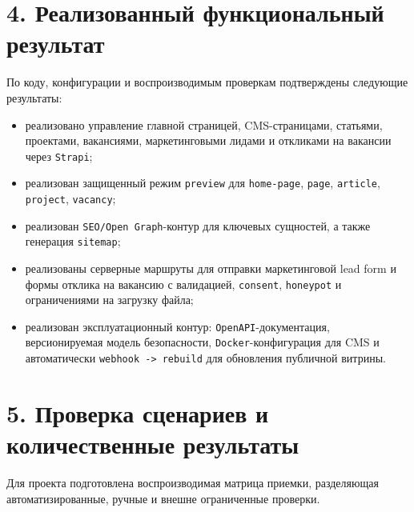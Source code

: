 \documentclass[12pt,a4paper]{article}
\begin{document}
\section*{4. Реализованный функциональный результат}

По коду, конфигурации и воспроизводимым проверкам подтверждены следующие результаты:
\begin{itemize}
  \item реализовано управление главной страницей, CMS-страницами, статьями, проектами,
  вакансиями, маркетинговыми лидами и откликами на вакансии через \texttt{Strapi};
  \item реализован защищенный режим \texttt{preview} для \texttt{home-page}, \texttt{page},
  \texttt{article}, \texttt{project}, \texttt{vacancy};
  \item реализован \texttt{SEO/Open Graph}-контур для ключевых сущностей, а также генерация
  \texttt{sitemap};
  \item реализованы серверные маршруты для отправки маркетинговой lead form и формы отклика
  на вакансию с валидацией, \texttt{consent}, \texttt{honeypot} и ограничениями на загрузку
  файла;
  \item реализован эксплуатационный контур: \texttt{OpenAPI}-документация, версионируемая
  модель безопасности, \texttt{Docker}-конфигурация для CMS и автоматически
  \texttt{webhook -> rebuild} для обновления публичной витрины.
\end{itemize}

\section*{5. Проверка сценариев и количественные результаты}

Для проекта подготовлена воспроизводимая матрица приемки, разделяющая автоматизированные,
ручные и внешне ограниченные проверки.
\end{document}
